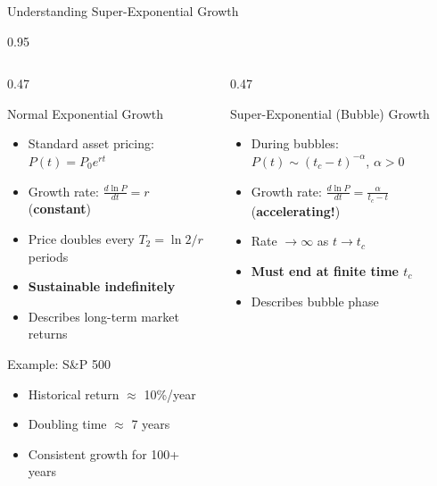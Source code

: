 \documentclass[9pt, aspectratio=169, t]{beamer}
\begin{document}
\begin{frame}{Understanding Super-Exponential Growth}
    \begin{cminipage}{0.95\textwidth}
    {\footnotesize
    \begin{columns}[T]
        \begin{column}{0.47\textwidth}
            \begin{block}{Normal Exponential Growth}
                \begin{itemize}\setlength{\itemsep}{0pt}
                    \item Standard asset pricing: $P(t) = P_0 e^{rt}$
                    \item Growth rate: $\frac{d\ln P}{dt} = r$ (\textbf{constant})
                    \item Price doubles every $T_2 = \ln 2 / r$ periods
                    \item \textbf{Sustainable indefinitely}
                    \item Describes long-term market returns
                \end{itemize}
            \end{block}

            \begin{exampleblock}{Example: S\&P 500}
                \begin{itemize}\setlength{\itemsep}{0pt}
                    \item Historical return $\approx$ 10\%/year
                    \item Doubling time $\approx$ 7 years
                    \item Consistent growth for 100+ years
                \end{itemize}
            \end{exampleblock}
        \end{column}
        \begin{column}{0.47\textwidth}
            \begin{alertblock}{Super-Exponential (Bubble) Growth}
                \begin{itemize}\setlength{\itemsep}{0pt}
                    \item During bubbles: $P(t) \sim (t_c - t)^{-\alpha}$, $\alpha > 0$
                    \item Growth rate: $\frac{d\ln P}{dt} = \frac{\alpha}{t_c - t}$ (\textbf{accelerating!})
                    \item Rate $\to \infty$ as $t \to t_c$
                    \item \textbf{Must end at finite time $t_c$}
                    \item Describes bubble phase
                \end{itemize}
            \end{alertblock}


\end{column}
\end{columns}}
\end{cminipage}
\end{frame}
\end{document}
